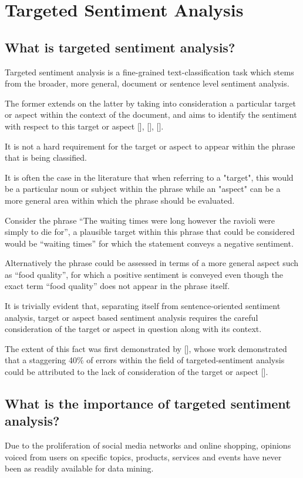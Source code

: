\documentclass[12pt, a4paper]{report}
\theoremstyle{definition}
\theoremstyle{definition}%
\theoremstyle{definition}%
\theoremstyle{definition}%
\theoremstyle{definition}%
\theoremstyle{definition}%
\renewcommand{\cite}[1]{[\citealp{#1}]}
\begin{document}
\section{Targeted Sentiment Analysis}
\subsection{What is targeted sentiment analysis?}
Targeted sentiment analysis is a fine-grained text-classification task which stems from the broader, more general, document or sentence level sentiment analysis. 

The former extends on the latter by taking into consideration a particular target or aspect within the context of the document, and aims to identify the sentiment with respect to this target or aspect \cite{pang2008}, \cite{liu2012}, \cite{pontiki}.

It is not a hard requirement for the target or aspect to appear within the phrase that is being classified. 

It is often the case in the literature that when referring to a "target", this would be a particular noun or subject within the phrase while an "aspect" can be a more general area within which the phrase should be evaluated. 

Consider the phrase \enquote{The waiting times were long however the ravioli were simply to die for}, a plausible target within this phrase that could be considered would be \enquote{waiting times} for which the statement conveys a negative sentiment. 

Alternatively the phrase could be assessed in terms of a more general aspect such as \enquote{food quality}, for which a positive sentiment is conveyed even though the exact term \enquote{food quality} does not appear in the phrase itself.   

It is trivially evident that, separating itself from sentence-oriented sentiment analysis, target or aspect based sentiment analysis requires the careful consideration of the target or aspect in question along with its context. 

The extent of this fact was first demonstrated by \cite{jiang2011}, whose work demonstrated that a staggering 40\% of errors within the field of targeted-sentiment analysis could be attributed to the lack of consideration of the target or aspect \cite{jiang2011}.

\subsection{What is the importance of targeted sentiment analysis?}
Due to the proliferation of social media networks and online shopping, opinions voiced from users on specific topics, products, services and events have never been as readily available for data mining. 
\end{document}
